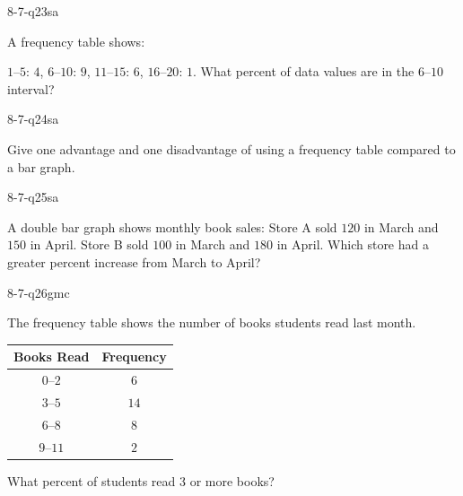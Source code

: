 \begin{practiceQuestion}{8-7-q23}{sa}
\begin{questionText}
A frequency table shows:

$1$--$5$: $4$, $6$--$10$: $9$, $11$--$15$: $6$, $16$--$20$: $1$. What percent of data values are in the $6$--$10$ interval?
\end{questionText}
\end{practiceQuestion}

\begin{practiceQuestion}{8-7-q24}{sa}
\begin{questionText}
Give one advantage and one disadvantage of using a frequency table compared to a bar graph.
\end{questionText}
\end{practiceQuestion}

\begin{practiceQuestion}{8-7-q25}{sa}
\begin{questionText}
A double bar graph shows monthly book sales: Store A sold $120$ in March and $150$ in April. Store B sold $100$ in March and $180$ in April. Which store had a greater percent increase from March to April?
\end{questionText}
\end{practiceQuestion}


\begin{practiceQuestion}{8-7-q26}{gmc}
\begin{questionText}
The frequency table shows the number of books students read last month.

\begin{center}
\begin{tabular}{|c|c|}
\hline
\textbf{Books Read} & \textbf{Frequency} \\
\hline
$0$--$2$ & $6$ \\
\hline
$3$--$5$ & $14$ \\
\hline
$6$--$8$ & $8$ \\
\hline
$9$--$11$ & $2$ \\
\hline
\end{tabular}
\end{center}

What percent of students read $3$ or more books?
\end{questionText}
\end{practiceQuestion}

